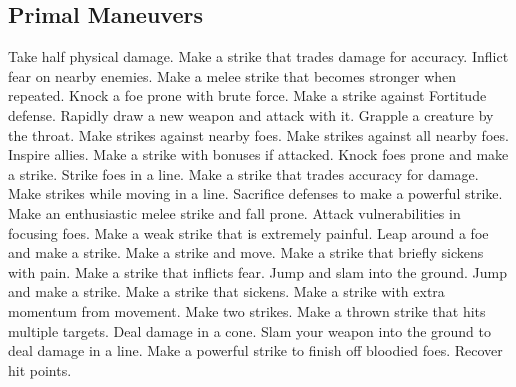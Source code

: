 \small
\subsection{Primal Maneuvers}\label{Primal Maneuvers}
\begin{spelllist}
 Take half physical damage.
 Make a strike that trades damage for accuracy.
 Inflict fear on nearby enemies.
 Make a melee strike that becomes stronger when repeated.
 Knock a foe prone with brute force.
 Make a strike against Fortitude defense.
 Rapidly draw a new weapon and attack with it.
 Grapple a creature by the throat.
 Make strikes against nearby foes.
 Make strikes against all nearby foes.
 Inspire allies.
 Make a strike with bonuses if attacked.
 Knock foes prone and make a strike.
 Strike foes in a line.
 Make a strike that trades accuracy for damage.
 Make strikes while moving in a line.
 Sacrifice defenses to make a powerful strike.
 Make an enthusiastic melee strike and fall prone.
 Attack vulnerabilities in focusing foes.
 Make a weak strike that is extremely painful.
 Leap around a foe and make a strike.
 Make a strike and move.
 Make a strike that briefly sickens with pain.
 Make a strike that inflicts fear.
 Jump and slam into the ground.
 Jump and make a strike.
 Make a strike that sickens.
 Make a strike with extra momentum from movement.
 Make two strikes.
 Make a thrown strike that hits multiple targets.
 Deal damage in a cone.
 Slam your weapon into the ground to deal damage in a line.
 Make a powerful strike to finish off bloodied foes.
 Recover hit points.
\end{spelllist}



